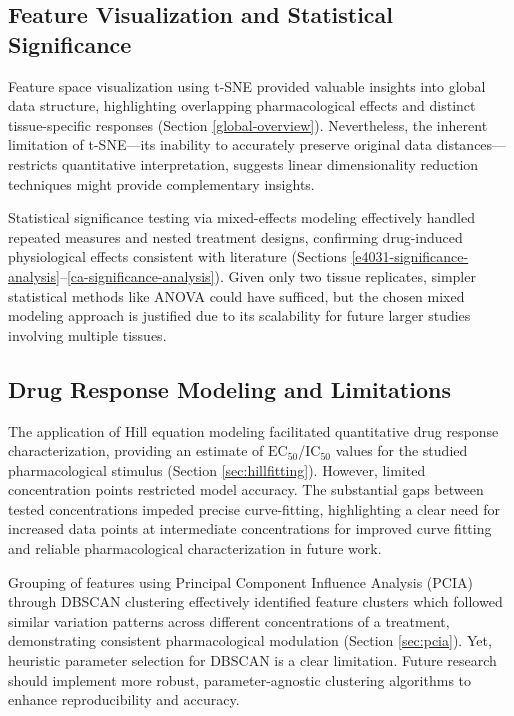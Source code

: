 \documentclass{report}
\begin{document}
    \subsection{Feature Visualization and Statistical Significance}
    Feature space visualization using t-SNE provided valuable insights into global data structure, highlighting overlapping pharmacological effects and distinct tissue-specific responses (Section \ref{global-overview}). Nevertheless, the inherent limitation of t-SNE—its inability to accurately preserve original data distances—restricts quantitative interpretation, suggests linear dimensionality reduction techniques might provide complementary insights.
    
    Statistical significance testing via mixed-effects modeling effectively handled repeated measures and nested treatment designs, confirming drug-induced physiological effects consistent with literature (Sections \ref{e4031-significance-analysis}–\ref{ca-significance-analysis}). Given only two tissue replicates, simpler statistical methods like ANOVA could have sufficed, but the chosen mixed modeling approach is justified due to its scalability for future larger studies involving multiple tissues.
    
    \subsection{Drug Response Modeling and Limitations}
    The application of Hill equation modeling facilitated quantitative drug response characterization, providing an estimate of \(\text{EC}_{50}\)/\(\text{IC}_{50}\) values for the studied pharmacological stimulus (Section \ref{sec:hillfitting}). However, limited concentration points restricted model accuracy. The substantial gaps between tested concentrations impeded precise curve-fitting, highlighting a clear need for increased data points at intermediate concentrations for improved curve fitting and reliable pharmacological characterization in future work.
    
    Grouping of  features using Principal Component Influence Analysis (PCIA) through DBSCAN clustering effectively identified feature clusters which followed similar variation patterns across different concentrations of a treatment, demonstrating consistent pharmacological modulation (Section \ref{sec:pcia}). Yet, heuristic parameter selection for DBSCAN is a clear limitation. Future research should implement more robust, parameter-agnostic clustering algorithms to enhance reproducibility and accuracy.
    
\end{document}
